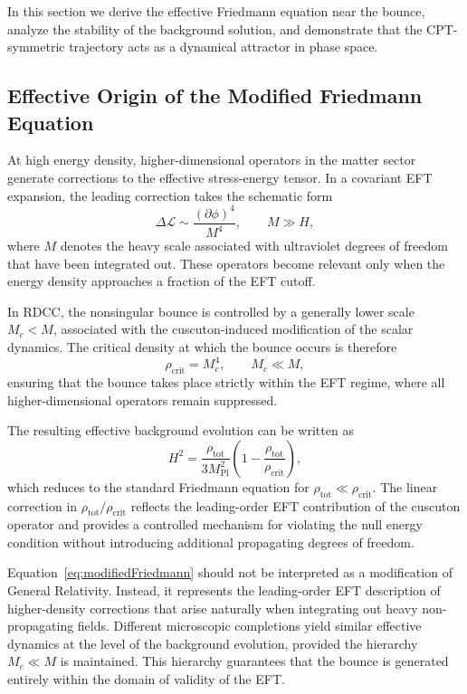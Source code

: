 \documentclass[11pt,a4paper]{article}
\begin{document}
In this section we derive the effective Friedmann equation near the bounce,
analyze the stability of the background solution, and demonstrate that the
CPT-symmetric trajectory acts as a dynamical attractor in phase space.

\subsection{Effective Origin of the Modified Friedmann Equation}

At high energy density, higher-dimensional operators in the matter sector
generate corrections to the effective stress-energy tensor. In a covariant EFT
expansion, the leading correction takes the schematic form
\begin{equation}
    \Delta\mathcal{L}
    \sim \frac{(\partial\phi)^{4}}{M^{4}},
    \qquad M \gg H,
\end{equation}
where \(M\) denotes the heavy scale associated with ultraviolet degrees of freedom
that have been integrated out. These operators become relevant only when the
energy density approaches a fraction of the EFT cutoff.

In RDCC, the nonsingular bounce is controlled by a generally lower scale
\(M_{c} < M\), associated with the cuscuton-induced modification of the scalar
dynamics. The critical density at which the bounce occurs is therefore
\begin{equation}
    \rho_{\mathrm{crit}} = M_{c}^{4},
    \qquad M_{c} \ll M,
\end{equation}
ensuring that the bounce takes place strictly within the EFT regime, where all
higher-dimensional operators remain suppressed.

The resulting effective background evolution can be written as
\begin{equation}
    H^{2}
    = \frac{\rho_{\mathrm{tot}}}{3M_{\mathrm{Pl}}^{2}}
      \left(1 - \frac{\rho_{\mathrm{tot}}}{\rho_{\mathrm{crit}}}\right),
    \label{eq:modifiedFriedmann}
\end{equation}
which reduces to the standard Friedmann equation for
\(\rho_{\mathrm{tot}} \ll \rho_{\mathrm{crit}}\). The linear correction in
\(\rho_{\mathrm{tot}}/\rho_{\mathrm{crit}}\) reflects the leading-order EFT
contribution of the cuscuton operator and provides a controlled mechanism for
violating the null energy condition without introducing additional propagating
degrees of freedom.

Equation~\eqref{eq:modifiedFriedmann} should not be interpreted as a modification
of General Relativity. Instead, it represents the leading-order EFT description
of higher-density corrections that arise naturally when integrating out heavy
non-propagating fields. Different microscopic completions yield similar effective
dynamics at the level of the background evolution, provided the hierarchy
\(M_{c} \ll M\) is maintained. This hierarchy guarantees that the bounce is
generated entirely within the domain of validity of the EFT.
\end{document}
